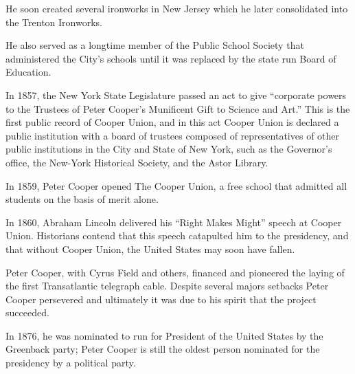 \documentclass{article}
\begin{document}
\begin{minipage}[t]{0.46\linewidth}
\fontsize{11pt}{13pt}\selectfont
\raggedright
\upshape
\begin{enumList}
\setcounter{enumListi}{\value{enumTemp}}

\item He soon created several ironworks in New Jersey which he later
consolidated into the {\mdseries Trenton Ironworks}.


\item He also served as a {\mdseries longtime member of the Public
School Society} that administered the City's schools until it was
replaced by the state run Board of Education.


\item In 1857, the New York State Legislature passed an act to give ``corporate
powers to the Trustees of Peter Cooper's Munificent Gift to Science and Art.''
This is the first public record of Cooper Union, and in this act Cooper Union
is declared a {\mdseries public institution with a board of trustees composed
of representatives of other public institutions in the City and State of New
York}, such as the Governor's office, the New-York Historical Society, and the
Astor Library.

\item In 1859, Peter Cooper opened The Cooper Union, a {\mdseries free school
that admitted all students on the basis of merit alone.}

\item In 1860, {\mdseries Abraham Lincoln} delivered his {\mdseries ``Right
Makes Might''} speech at Cooper Union. Historians contend that this speech
catapulted him to the presidency, and that {\mdseries without Cooper Union,
the United States may soon have fallen.}

\item Peter Cooper, with Cyrus Field and others, financed and pioneered the
laying of the {\mdseries first Transatlantic telegraph cable}. Despite several
majors setbacks Peter Cooper persevered and ultimately it was due to his
spirit that the project succeeded.

\item In 1876, he was {\mdseries nominated to run for President of the United
States} by the Greenback party; Peter Cooper is still the {\mdseries oldest
person} nominated for the presidency by a political party.


\end{enumList}
\end{minipage}
\end{document}
